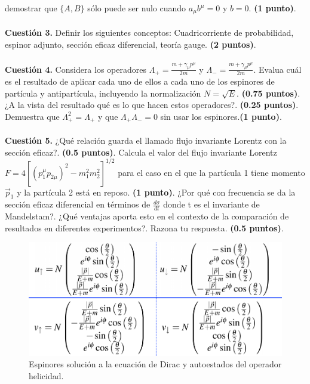 \documentclass[paper=a4, fontsize=11pt]{scrartcl} %
\numberwithin{equation}{section} %
\numberwithin{figure}{section} %
\numberwithin{table}{section} %
\begin{document}
demostrar que $\{A,B\}$ sólo puede ser nulo cuando $a_\mu b^\mu=0$ y $b=0$. \textbf{(1 punto)}.   
\\
\\
\textbf{Cuestión 3.} Definir los siguientes conceptos: Cuadricorriente de probabilidad, espinor adjunto, sección eficaz diferencial, teoría gauge. \textbf{(2 puntos)}.
\\
\\
\textbf{Cuestión 4.} Considera los operadores $\Lambda_+ = \frac{m + \gamma_\mu p^\mu}{2m}$ y $\Lambda_- = \frac{m + \gamma_\mu p^\mu}{2m}$. Evalua cuál es
el resultado de aplicar cada uno de ellos a cada uno de los espinores de partícula y antipartícula, incluyendo la normalización $N=\sqrt{E}$. \textbf{(0.75 puntos)}.
¿A la vista del resultado qué es lo que hacen estos operadores?. \textbf{(0.25 puntos)}. Demuestra que $\Lambda_+^2=\Lambda_+$ y que $\Lambda_+\Lambda_-=0$ sin usar
los espinores.\textbf{(1 punto)}.
\\
\\
\textbf{Cuestión 5.} ¿Qué relación guarda el llamado flujo invariante Lorentz con la sección eficaz?. \textbf{(0.5 puntos)}. Calcula el valor del flujo invariante Lorentz
$F=4[(p^\mu_1p_{2\mu})^2 - m_1^2 m_2^2]^{1/2}$ para el caso en el que la partícula 1 tiene momento $\vec{p}_1$ y la partícula 2 está en reposo. \textbf{(1 punto)}. ¿Por qué
con frecuencia se da la sección eficaz diferencial en términos de $\frac{d\sigma}{dt}$ donde t es el invariante de Mandelstam?. ¿Qué ventajas aporta esto en el contexto
de la comparación de resultados en diferentes experimentos?. Razona tu respuesta. \textbf{(0.5 puntos)}. 
  
\vspace{3cm}

\begin{figure}[!h]
\begin{center}
\includegraphics[width=0.6\linewidth]{espinores.png}
\end{center}
\caption{Espinores solución a la ecuación de Dirac y autoestados del operador helicidad.}
\label{espinores}
\end{figure}
\end{document}
